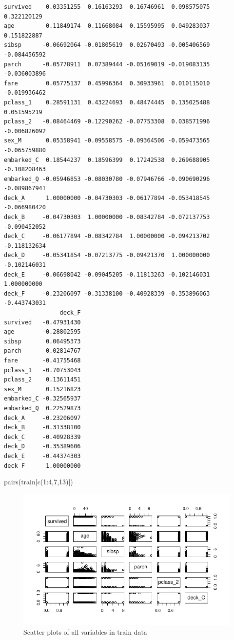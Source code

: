 \documentclass[
  letterpaper,
  DIV=11,
  numbers=noendperiod]{scrartcl}
\newenvironment{Shaded}{\begin{snugshade}}{\end{snugshade}}
\newcommand{\DecValTok}[1]{\textcolor[rgb]{0.68,0.00,0.00}{#1}}
\newcommand{\FunctionTok}[1]{\textcolor[rgb]{0.28,0.35,0.67}{#1}}
\newcommand{\NormalTok}[1]{\textcolor[rgb]{0.00,0.23,0.31}{#1}}
\newcommand{\SpecialCharTok}[1]{\textcolor[rgb]{0.37,0.37,0.37}{#1}}
\begin{document}
\begin{verbatim}
survived    0.03351255  0.16163293  0.16746961  0.098575075  0.322120129
age         0.11849174  0.11668084  0.15595995  0.049283037  0.151822887
sibsp      -0.06692064 -0.01805619  0.02670493 -0.005406569 -0.084456592
parch      -0.05778911  0.07389444 -0.05169019 -0.019083135 -0.036003896
fare        0.05775137  0.45996364  0.30933961  0.010115010 -0.019936462
pclass_1    0.28591131  0.43224693  0.48474445  0.135025488  0.051595219
pclass_2   -0.08464469 -0.12290262 -0.07753308  0.038571996 -0.006826092
sex_M       0.05358941 -0.09558575 -0.09364506 -0.059473565 -0.065759880
embarked_C  0.18544237  0.18596399  0.17242538  0.269688905 -0.108208463
embarked_Q -0.05946853 -0.08030780 -0.07946766 -0.090690296 -0.089867941
deck_A      1.00000000 -0.04730303 -0.06177894 -0.053418545 -0.066980420
deck_B     -0.04730303  1.00000000 -0.08342784 -0.072137753 -0.090452052
deck_C     -0.06177894 -0.08342784  1.00000000 -0.094213702 -0.118132634
deck_D     -0.05341854 -0.07213775 -0.09421370  1.000000000 -0.102146031
deck_E     -0.06698042 -0.09045205 -0.11813263 -0.102146031  1.000000000
deck_F     -0.23206097 -0.31338100 -0.40928339 -0.353896063 -0.443743031
                deck_F
survived   -0.47931430
age        -0.28802595
sibsp       0.06495373
parch       0.02814767
fare       -0.41755468
pclass_1   -0.70753043
pclass_2    0.13611451
sex_M       0.15216823
embarked_C -0.32565937
embarked_Q  0.22529873
deck_A     -0.23206097
deck_B     -0.31338100
deck_C     -0.40928339
deck_D     -0.35389606
deck_E     -0.44374303
deck_F      1.00000000
\end{verbatim}

\begin{Shaded}
\begin{Highlighting}[]
\FunctionTok{pairs}\NormalTok{(train[}\FunctionTok{c}\NormalTok{(}\DecValTok{1}\SpecialCharTok{:}\DecValTok{4}\NormalTok{,}\DecValTok{7}\NormalTok{,}\DecValTok{13}\NormalTok{)])}
\end{Highlighting}
\end{Shaded}

\begin{figure}[H]

{\centering \includegraphics{FinalProject_files/figure-pdf/unnamed-chunk-14-1.pdf}

}

\caption{Scatter plots of all variables in train data}

\end{figure}%
\end{document}
